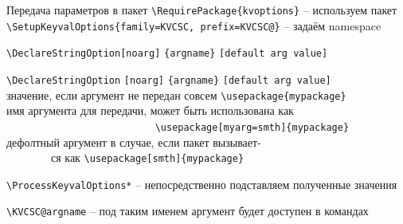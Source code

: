 \begin{frame}[fragile]{Передача параметров в пакет}\relax
    \footnotesize
    \lstinline|\RequirePackage{kvoptions}| -- используем пакет \\ 
    \lstinline|\SetupKeyvalOptions{family=KVCSC, prefix=KVCSC@}| -- задаём namespace
    \vspace{-1ex}
    {\scriptsize
    \lstset{basicstyle=\tt\tiny}
    \begin{tabbing}
     
     \lstinline|\DeclareStringOption|\= \lstinline|[noarg]| \= \lstinline|{argname}| \= \lstinline|[default arg value]|\kill

        \lstset{basicstyle=\tt\tiny}\lstinline|\DeclareStringOption|\> \lstinline|[noarg]| \> \lstinline|{argname}| \> \lstinline|[default arg value]| \\ 
        \> значение, если аргумент не передан совсем \lstinline|\usepackage{mypackage}|  \> \> \\
        \>  \> имя аргумента для передачи, может быть использована как  \> \\
        \>  \> ~~~~~~~~~~~~~~~~~~~~~~~~~~ \lstinline|\usepackage[myarg=smth]{mypackage}|  \> \\
        \>  \>  \> дефолтный аргумент в случае, если пакет вызывает-  \\
        \>  \>  \> ~~~~~~~~ся как \lstinline|\usepackage[smth]{mypackage}|  \\
    \end{tabbing}
    }

    \vspace{-2ex}
    \lstinline|\ProcessKeyvalOptions*| -- непосредственно подставляем полученные значения
    
    \lstinline|\KVCSC@argname| -- под таким именем аргумент будет доступен в командах
\end{frame}

